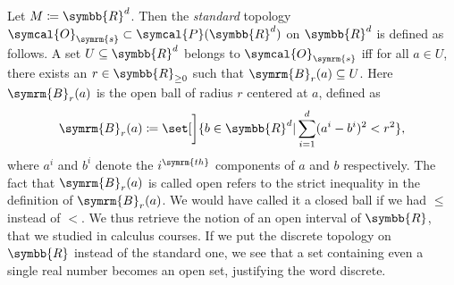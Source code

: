 \documentclass[a4 paper, 12pt]{book}
\theoremstyle{definition}
\newcommand{\rr}{\symbb{R}}
\newcommand{\topology}{\symcal{O}}
\newcommand{\powerset}{\symcal{P}}
\newcommand{\ball}{\symrm{B}}
\begin{document}
    Let \(M \coloneq \rr^d\). Then the \textit{standard} topology \(\topology_{\symrm{s}} \subset \powerset(\rr^d)\) on \(\rr^d\) is defined as follows. A set \(U \subseteq \rr^d\) belongs to \(\topology_{\symrm{s}}\) iff for all \(a \in U\), there exists an \(r \in \rr_{\geq 0}\) such that \(\ball_r(a) \subseteq U\). Here \(\ball_r(a)\) is the open ball of radius \(r\) centered at \(a\), defined as 
    \[
        \ball_r(a) \coloneq \set[\bigg]{b \in \rr^d | \sum_{i=1}^d (a^i - b^i)^2 < r^2},
    \] 
    where \(a^i\) and \(b^i\) denote the \(i^{\symrm{th}}\) components of \(a\) and \(b\) respectively. The fact that \(\ball_r(a)\) is called open refers to the strict inequality in the definition of \(\ball_r(a)\). We would have called it a closed ball if we had \(\leq\) instead of \(<\). We thus retrieve the notion of an open interval of \(\rr\), that we studied in calculus courses. If we put the discrete topology on \(\rr\) instead of the standard one, we see that a set containing even a single real number becomes an open set, justifying the word discrete.
    \nocite{*}
    \printbibliography[heading=bibintoc]
\end{document}

